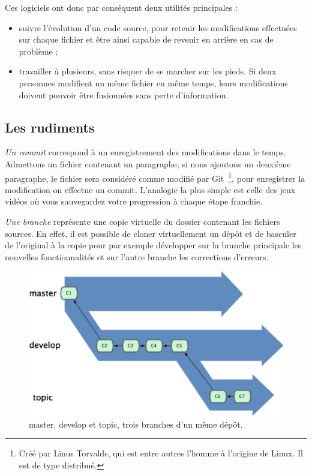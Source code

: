Ces logiciels ont donc par conséquent deux utilités principales :
\begin{itemize}
    \item suivre l’évolution d’un code source, pour retenir les modifications
effectuées sur chaque fichier et être ainsi capable de revenir en arrière en
cas de problème ;
    \item travailler à plusieurs, sans risquer de se marcher sur les pieds.
Si deux personnes modifient un même fichier en même temps, leurs modifications
doivent pouvoir être fusionnées sans perte d’information.
\end{itemize}

\subsection{Les rudiments}

\emph{Un commit} correspond à un enregistrement des modifications dans le
temps. Admettons un fichier contenant un paragraphe, si nous ajoutons un
deuxième paragraphe, le fichier sera considéré comme modifié par Git\,
\footnote{Créé par Linus Torvalds, qui est entre autres l'homme à l'origine de
Linux. Il est de type distribué.}, pour enregistrer la modification on effectue
un commit. L'analogie la plus simple est celle des jeux vidéos où vous
sauvegardez votre progression à chaque étape franchie.

\emph{Une branche} représente une \og copie virtuelle \fg{} du dossier
contenant les fichiers sources. En effet, il est possible de cloner
virtuellement un dépôt et de basculer de l'original à la copie pour par exemple
développer sur la branche principale les nouvelles fonctionnalités et sur
l'autre branche les corrections d'erreurs.

\begin{figure}
\begin{center}
\includegraphics[scale=0.8]{images/branches.png}
\caption{master, develop et topic, trois branches d'un même dépôt.}
\end{center}
\end{figure}

